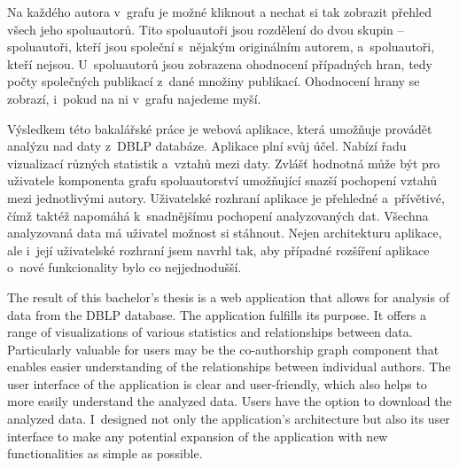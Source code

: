 \documentclass[
  biblatex,
  sourcecodes,
  glossaries,
  index
]{kidiplom}
\begin{document}
Na každého autora v~grafu je možné kliknout a nechat si tak zobrazit přehled všech jeho spoluautorů. Tito spoluautoři jsou rozdělení do dvou skupin -- spoluautoři, kteří jsou společní s~nějakým originálním autorem, a~spoluautoři, kteří nejsou. U~spoluautorů jsou zobrazena ohodnocení případných hran, tedy počty společných publikací z~dané množiny publikací. Ohodnocení hrany se zobrazí, i~pokud na ni v~grafu najedeme myší.

\begin{kiconclusions}


Výsledkem této bakalářské práce je webová aplikace, která umožňuje provádět analýzu nad daty z~DBLP databáze. Aplikace plní svůj účel. Nabízí řadu vizualizací různých statistik a~vztahů mezi daty. Zvlášť hodnotná může být pro uživatele komponenta grafu spoluautorství umožňující snazší pochopení vztahů mezi jednotlivými autory. Uživatelské rozhraní aplikace je přehledné a~přívětivé, čímž taktéž napomáhá k~snadnějšímu pochopení analyzovaných dat. Všechna analyzovaná data má uživatel možnost si stáhnout. Nejen architekturu aplikace, ale i~její uživatelské rozhraní jsem navrhl tak, aby případné rozšíření aplikace o~nové funkcionality bylo co nejjednodušší.

\end{kiconclusions}

\begin{kiconclusions}[english]
The result of this bachelor’s thesis is a web application that allows for analysis of data from the DBLP database. The application fulfills its purpose. It offers a range of visualizations of various statistics and relationships between data. Particularly valuable for users may be the co-authorship graph component that enables easier understanding of the relationships between individual authors. The user interface of the application is clear and user-friendly, which also helps to more easily understand the analyzed data. Users have the option to download the analyzed data. I~designed not only the application’s architecture but also its user interface to make any potential expansion of the application with new functionalities as simple as possible.
\end{kiconclusions}

\appendix
\end{document}

